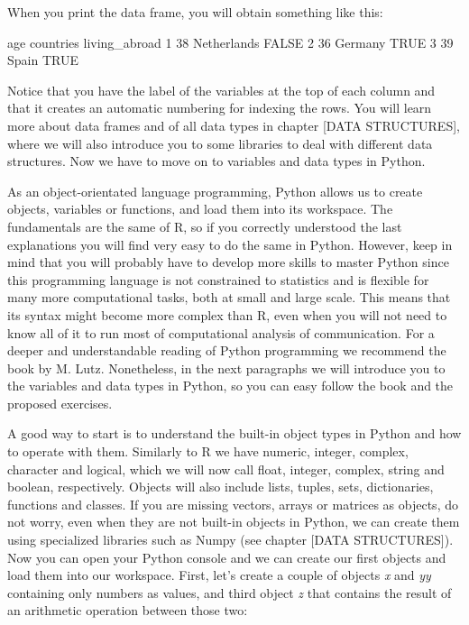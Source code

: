 When you print the data frame, you will obtain something like this:

\begin{exampler}
  	age   	countries 		living_abroad
1 	 38 	Netherlands         	FALSE
2 	 36 	Germany         	TRUE
3 	 39    	Spain          		TRUE
\end{exampler}

Notice that you have the label of the variables at the top of each column and that it creates an automatic numbering for indexing the rows.  You will learn more about data frames and of all data types in chapter [DATA STRUCTURES], where we will also introduce you to some libraries to deal with different data structures. Now we have to move on to variables and data types in Python.

As an object-orientated language programming, Python allows us to create objects, variables or functions, and load them into its workspace. The fundamentals are the same of R, so if you correctly understood the last explanations you will find very easy to do the same in Python. However, keep in mind that you will probably have to develop more skills to master Python since this programming language is not constrained to statistics and is flexible for many more computational tasks, both at small and large scale. This means that its syntax might become more complex than R, even when you will not need to know all of it to run most of computational analysis of communication.  For a deeper and understandable reading of Python programming we recommend the book by M. Lutz\cite{lutz2013learning}. Nonetheless, in the next paragraphs we will introduce you to the variables and data types in Python, so you can easy follow the book and the proposed exercises.  

A good way to start is to understand the built-in object types in Python and how to operate with them. Similarly to R we have numeric, integer, complex, character and logical, which we will now call float, integer, complex, string and boolean, respectively. Objects will also include lists, tuples, sets, dictionaries, functions and classes. If you are missing vectors, arrays or matrices as objects, do not worry, even when they are not built-in objects in Python, we can create them using specialized libraries such as Numpy (see chapter [DATA STRUCTURES]). Now you can open your Python console and we can create our first objects and load them into our workspace. First, let’s create a couple of objects \emph{x} and \emph{yy} containing only numbers as values, and third object \emph{z} that contains the result of an arithmetic operation between those two:

